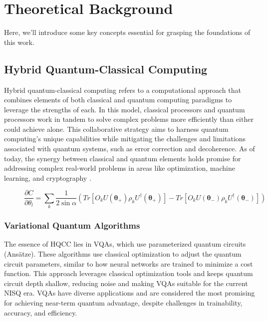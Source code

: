 

\section{Theoretical Background}
\label{sec: backg}

Here, we'll introduce some key concepts essential for grasping the foundations of this work.


\subsection{Hybrid Quantum-Classical Computing}
\label{sec: HQCC}
Hybrid quantum-classical computing refers to a computational approach that combines elements of both classical and quantum computing paradigms to leverage the strengths of each. In this model, classical processors and quantum processors work in tandem to solve complex problems more efficiently than either could achieve alone. This collaborative strategy aims to harness quantum computing's unique capabilities while mitigating the challenges and limitations associated with quantum systems, such as error correction and decoherence. As of today, the synergy between classical and quantum elements holds promise for addressing complex real-world problems in areas like optimization, machine learning, and cryptography \cite{Cerezo_2021}.

\begin{figure}[b]
    \centering
    \begin{equation}\label{eq:param_shift}\tag{3}
        \frac{\partial C}{\partial \theta_l} = \sum_k \frac{1}{2\sin{\alpha}}\left(Tr\left[O_k U(\boldsymbol{\theta_+}) \rho_k U^{\dagger}(\boldsymbol{\theta_+})\right] - Tr\left[O_k U(\boldsymbol{\theta_-}) \rho_k U^{\dagger}(\boldsymbol{\theta_-})\right]\right)
    \end{equation}
\end{figure}

\subsubsection{Variational Quantum Algorithms}
The essence of HQCC lies in VQAs, which use parameterized quantum circuits (Ansätze). These algorithms use classical optimization to adjust the quantum circuit parameters, similar to how neural networks are trained to minimize a cost function. This approach leverages classical optimization tools and keeps quantum circuit depth shallow, reducing noise and making VQAs suitable for the current NISQ era. VQAs have diverse applications and are considered the most promising for achieving near-term quantum advantage, despite challenges in trainability, accuracy, and efficiency.

